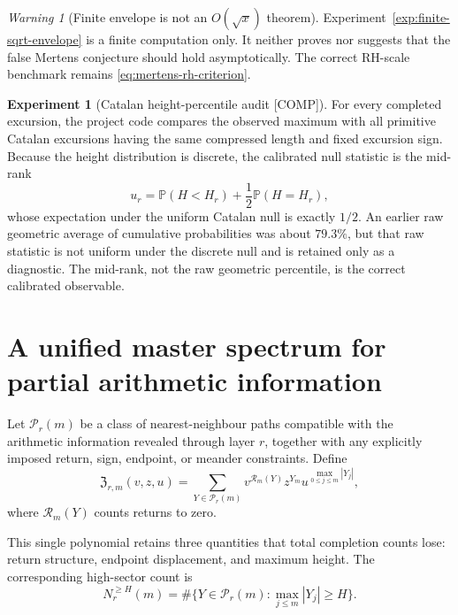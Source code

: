 \documentclass[11pt]{amsart}
\numberwithin{equation}{section}
\theoremstyle{plain}
\theoremstyle{definition}
\newtheorem{experiment}[theorem]{Experiment}
\theoremstyle{remark}
\newtheorem{warning}[theorem]{Warning}
\newcommand{\COMP}{\textup{[COMP]}}
\begin{document}
\begin{warning}[Finite envelope is not an $O(\sqrt x)$ theorem]
\label{warn:finite-envelope}
Experiment~\ref{exp:finite-sqrt-envelope} is a finite computation only.  It neither proves nor suggests that the false Mertens conjecture
should hold asymptotically.  The correct RH-scale benchmark remains \eqref{eq:mertens-rh-criterion}.
\end{warning}

\begin{experiment}[Catalan height-percentile audit \COMP]
\label{exp:catalan-percentile}
For every completed excursion, the project code compares the observed maximum with all primitive Catalan excursions having the same
compressed length and fixed excursion sign.  Because the height distribution is discrete, the calibrated null statistic is the mid-rank
\begin{equation}
u_r
=
\mathbb P(H<H_r)+\frac12\mathbb P(H=H_r),
\label{eq:catalan-midrank}
\end{equation}
whose expectation under the uniform Catalan null is exactly $1/2$.  An earlier raw geometric average of cumulative probabilities was about
$79.3\%$, but that raw statistic is not uniform under the discrete null and is retained only as a diagnostic.  The mid-rank, not the raw
geometric percentile, is the correct calibrated observable.
\end{experiment}

\section{A unified master spectrum for partial arithmetic information}
\label{sec:master-spectrum}

Let $\mathcal P_r(m)$ be a class of nearest-neighbour paths compatible with the arithmetic information revealed through layer $r$, together
with any explicitly imposed return, sign, endpoint, or meander constraints.  Define
\begin{equation}
\mathfrak Z_{r,m}(v,z,u)
=
\sum_{Y\in\mathcal P_r(m)}
v^{\mathcal R_m(Y)}z^{Y_m}u^{\max_{0\le j\le m}|Y_j|},
\label{eq:master-spectrum}
\end{equation}
where $\mathcal R_m(Y)$ counts returns to zero.

This single polynomial retains three quantities that total completion counts lose: return structure, endpoint displacement, and maximum
height.  The corresponding high-sector count is
\begin{equation}
N_r^{\ge H}(m)
=
\#\{Y\in\mathcal P_r(m):\max_{j\le m}|Y_j|\ge H\}.
\label{eq:high-sector-count}
\end{equation}
\end{document}

